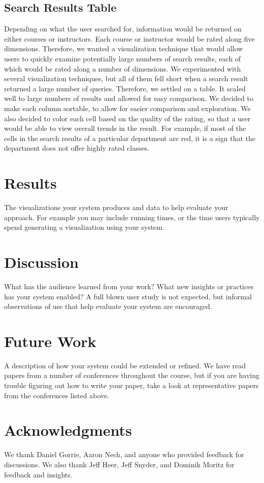 \documentclass{chi2009}
\begin{document}
\subsection{Search Results Table}
Depending on what the user searched for, information would be returned on either courses or instructors. Each course or instructor would be rated along five dimensions. Therefore, we wanted a visualization technique that would allow users to quickly examine potentially large numbers of search results, each of which would be rated along a number of dimensions. We experimented with several visualization techniques, but all of them fell short when a search result returned a large number of queries. Therefore, we settled on a table. It scaled well to large numbers of results and allowed for easy comparison. We decided to make each column sortable, to allow for easier comparison and exploration. We also decided to color each cell based on the quality of the rating, so that a user would be able to view overall trends in the result. For example, if most of the cells in the search results of a particular department are red, it is a sign that the department does not offer highly rated classes.

\section{Results}

The visualizations your system produces and data to help evaluate your approach. For example you may include running times, or the time users typically spend generating a visualization using your system.

\section{Discussion}

What has the audience learned from your work? What new insights or practices has your system enabled? A full blown user study is not expected, but informal observations of use that help evaluate your system are encouraged.

\section{Future Work}

A description of how your system could be extended or refined. We have read papers from a number of conferences throughout the course, but if you are having trouble figuring out how to write your paper, take a look at representative papers from the conferences listed above.

\section{Acknowledgments}

We thank Daniel Gorrie, Aaron Nech, and anyone who provided feedback for discussions. We also thank Jeff Heer, Jeff Snyder, and Dominik Moritz for feedback and insights.



\end{document}
